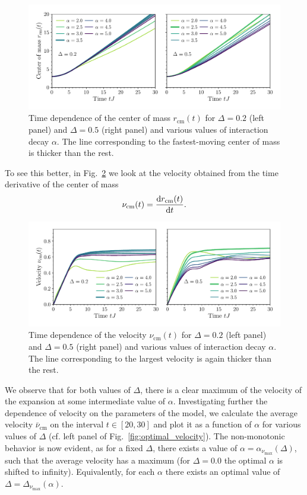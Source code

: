 \begin{figure}[htbp]
  \centering
  \includegraphics[width=0.9\linewidth]{Figures/center_of_mass.pdf}
  \caption{Time dependence of the center of mass \(r_{\text{cm}}(t)\) for \(\Delta = 0.2\) (left panel) and \(\Delta = 0.5\)
  (right panel) and various values of interaction decay \(\alpha\). The line corresponding to the fastest-moving center of mass
  is thicker than the rest.}
  \label{fig:center_of_mass}
\end{figure}

To see this better, in Fig.~\ref{fig:velocity} we look at the velocity
obtained from the time derivative of the center of mass
\begin{equation}
  {\nu}_{\text{cm}}(t) = \dv{r_{\text{cm}}(t)}{t}.
  \label{eq:velocity}
\end{equation}
\begin{figure}[htbp]
  \centering
  \includegraphics[width=0.9\linewidth]{Figures/velocity.pdf}
  \caption{Time dependence of the velocity \(\nu_{\text{cm}}(t)\) for \(\Delta = 0.2\) (left panel) and \(\Delta = 0.5\)
  (right panel) and various values of interaction decay \(\alpha\). The line corresponding to the largest velocity
  is again thicker than the rest.}
  \label{fig:velocity}
\end{figure}
We observe that for both values of \(\Delta\), there is a clear maximum of the velocity of the expansion
at some intermediate value of \(\alpha\). Investigating further the dependence of velocity on the parameters
of the model, we calculate the average velocity \(\bar{\nu}_{\text{cm}}\) on the interval \(t\in\left[20,30\right]\)
and plot it as a function of \(\alpha\) for various values of \(\Delta\)
(cf. left panel of Fig.~\ref{fig:optimal_velocity}).
The non-monotonic behavior is now evident, as for a fixed \(\Delta\), there exists a value of 
\( \alpha = \alpha_{\nu_{\mathrm{max}}}(\Delta) \),
such that the average velocity has a maximum (for \(\Delta = 0.0\) the optimal \(\alpha\) is shifted to infinity).
Equivalently, for each \(\alpha\) there exists an optimal value of \(\Delta = \Delta_{\nu_{\mathrm{max}}} (\alpha)\).

